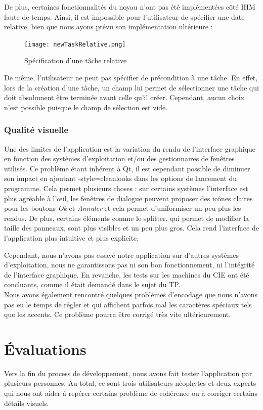 			\newpage
			De plus, certaines fonctionnalités du noyau n'ont pas été implémentées côté IHM faute de temps. Ainsi, il est impossible pour l'utilisateur de spécifier une date relative, bien que nous ayons prévu son implémentation ultérieure :
			\begin{figure}[h!]
				\centering
			   \texttt{[image: newTaskRelative.png]}
			   \caption{Spécification d'une tâche relative}
			\end{figure}
			\FloatBarrier
		
			De même, l'utilisateur ne peut pas spécifier de précondition à une tâche. En effet, lors de la création d'une tâche, un champ lui permet de sélectionner une tâche qui doit absolument être terminée avant celle qu'il créer. Cependant, aucun choix n'est possible puisque le champ de sélection est vide.
			
		
		\subsection{Qualité visuelle}
			Une des limites de l'application est la variation du rendu de l'interface graphique en fonction des systèmes d'exploitation et/ou des gestionnaires de fenêtres utilisés. Ce problème étant inhérent à Qt, il est cependant possible de diminuer son impact en ajoutant \og -style=cleanlooks \fg dans les options de lancement du programme. Cela permet plusieurs choses : sur certains systèmes l'interface est plus agréable à l'{\oe}il, les fenêtres de dialogue peuvent proposer des icônes claires pour les boutons \emph{Ok} et \emph{Annuler} et cela permet d'uniformiser un peu plus les rendus. De plus, certains éléments comme le splitter, qui permet de modifier la taille des panneaux, sont plus visibles et un peu plus gros. Cela rend l'interface de l'application plus intuitive et plus explicite.
	
			Cependant, nous n'avons pas essayé notre application sur d'autres systèmes d'exploitation, nous ne garantissons pas ni son bon fonctionnement, ni l'intégrité de l'interface graphique. En revanche, les tests sur les machines du CIE ont été concluants, comme il était demandé dans le sujet du TP.\\
			
			Nous avons également rencontré quelques problèmes d'encodage que nous n'avons pas eu le temps de régler et qui affichent parfois mal les caractères spéciaux tels que les accents. Ce problème pourra être corrigé très vite ultérieurement.


\chapter{Évaluations}
	Vers la fin du process de développement, nous avons fait tester l'application par plusieurs personnes. Au total, ce sont trois utilisateurs néophytes et deux experts qui nous ont aider à repérer certains problème de cohérence ou à corriger certains détails visuels.

